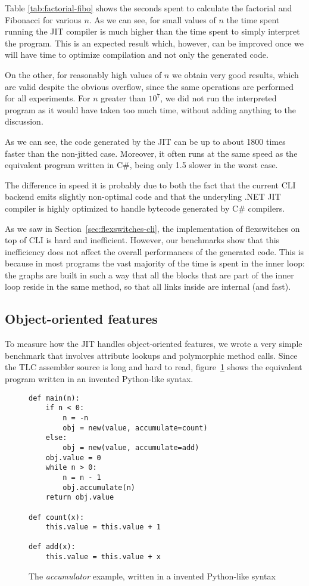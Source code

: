 Table \ref{tab:factorial-fibo} shows the seconds spent to calculate
the factorial and Fibonacci for various $n$.  As we can see, for small values
of $n$ the time spent running the JIT compiler is much higher than the time
spent to simply interpret the program.  This is an expected result
which, however, can be improved once we will have time
to optimize compilation and not only the generated code.

On the other, for reasonably high values of $n$ we obtain very good
results, which are valid despite the obvious overflow, since the 
same operations are performed for all experiments.
For $n$ greater than $10^7$, we did not run the interpreted program as it would have taken too
much time, without adding anything to the discussion.

As we can see, the code generated by the JIT can be up to about 1800 times faster
than the non-jitted case.  Moreover, it often runs at the same speed as the
equivalent program written in C\#, being only 1.5 slower in the worst case.

The difference in speed it is probably due to both the fact that the current
CLI backend emits slightly non-optimal code and that the underyling .NET JIT
compiler is highly optimized to handle bytecode generated by C\# compilers.

As we saw in Section~\ref{sec:flexswitches-cli}, the implementation of
flexswitches on top of CLI is hard and inefficient.  However, our benchmarks
show that this inefficiency does not affect the overall performances of the
generated code.  This is because in most programs the vast majority of the
time is spent in the inner loop: the graphs are built in such a way that all
the blocks that are part of the inner loop reside in the same method, so that
all links inside are internal (and fast).


\subsection{Object-oriented features}

To measure how the JIT handles object-oriented features, we wrote a very
simple benchmark that involves attribute lookups and polymorphic method calls.
Since the TLC assembler source is long and hard to read,
figure~\ref{fig:accumulator} shows the equivalent program written in an
invented Python-like syntax.

\begin{figure}[h]
\begin{center}
\begin{lstlisting}
def main(n):
    if n < 0:
        n = -n
        obj = new(value, accumulate=count)
    else:
        obj = new(value, accumulate=add)
    obj.value = 0
    while n > 0:
        n = n - 1
        obj.accumulate(n)
    return obj.value

def count(x):
    this.value = this.value + 1

def add(x):
    this.value = this.value + x
\end{lstlisting}
\caption{The \emph{accumulator} example, written in a invented Python-like syntax}
\label{fig:accumulator}
\end{center}
\end{figure}

